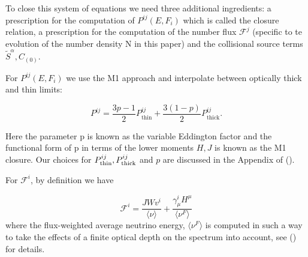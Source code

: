 To close this system of equations we need three additional ingredients: a prescription for the computation of $P^{ij}(E, F_i)$ which is called the closure relation, a prescription for the computation of the number flux $\mathcal{F}^j$ (specific to te evolution of the number density N in this paper) and the collisional source terms $\tilde{S}^\alpha, C_{(0)}$.

For $P^{ij}(E, F_i)$  we use the M1 approach and interpolate between optically thick and thin limits:

\begin{equation}
P^{ij} = \frac{3p-1}{2}P^{ij}_{\text{thin}} + \frac{3(1-p)}{2}P^{ij}_{\text{thick}}.
\end{equation}

Here the parameter p is known as the variable Eddington factor and the functional form of p in terms of the lower moments $H,J$ is known as the M1 closure. Our choices for $P^{ij}_{\rm thin}, P^{ij}_{\rm thick}$ and $p$ are discussed in the Appendix of (\cite{foucartm1:2015}).

For $\mathcal{F}^i$, by definition we have

\begin{equation}
  \mathcal{F}^i = \frac{JWv^i}{\langle \nu \rangle} + \frac{\gamma^i_\mu H^\mu}{\langle \nu^F \rangle}
\end{equation}
%
where the flux-weighted average neutrino energy,  $\langle \nu^F \rangle$ is computed in such a way to take the effects of a finite optical depth on the spectrum into account, see (\cite{foucart:2015gaa}) for details.

